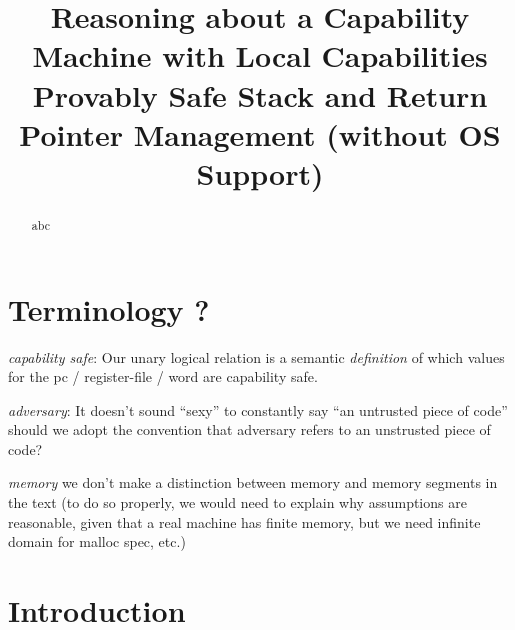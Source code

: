 \documentclass[compsoc,conference,letterpaper,fleqn]{IEEEtran}
\begin{document}
\setlength{\mathindent}{.2cm}

\title{Reasoning about a Capability Machine with Local Capabilities\\
 Provably Safe Stack and Return Pointer Management (without OS Support)}


\author{%
 \and
{}
   \and
{}}

\maketitle

\begin{abstract}
  abc
\end{abstract}

\section*{Terminology ?}

\emph{capability safe}: 
Our unary logical relation is a semantic \emph{definition}
of which values for the
pc / register-file / word are capability safe. 

\emph{adversary}: It doesn't sound ``sexy'' to constantly say ``an untrusted
piece of code'' should we adopt the convention that adversary refers
to an unstrusted piece of code?

\emph{memory}  we don't make a distinction between memory and memory
segments in the text  (to do so properly, we would need to explain why
assumptions
are reasonable, given that a real machine has finite memory, but we
need infinite domain for malloc spec, etc.)


\section{Introduction}
\label{sec:introduction}
\end{document}
